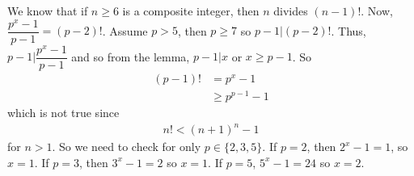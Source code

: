 \documentclass[main.tex]{subfile}
\begin{document}
	\begin{solution}
		We know that if $n\geq 6$ is a composite integer, then $n$ divides $(n-1)!$. Now, $\dfrac{p^x-1}{p-1}=(p-2)!$. Assume $p>5$, then $p\geq7$ so $p-1|(p-2)!$. Thus, $p-1 \big| \dfrac{p^x-1}{p-1}$ and so from the lemma, $p-1|x$ or $x\geq p-1$. So
			\begin{align*}
				(p-1)!
					& =  p^x-1\\
					& \geq p^{p-1}-1
			\end{align*}
		which is not true since
			\begin{align*}
				n!  < (n+1)^n-1
			\end{align*}
		for $n>1$. So we need to check for only $p\in\{2,3,5\}$. If $p=2$, then $2^x-1=1$, so $x=1$. If $p=3$, then $3^x-1=2$ so $x=1$. If $p=5$, $5^x-1=24$ so $x=2$.
	\end{solution}
\end{document}
